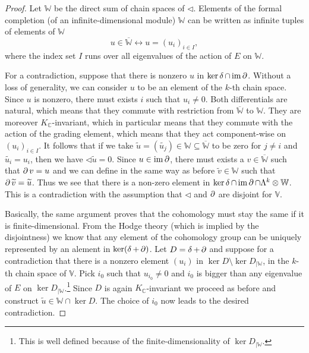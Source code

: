 \begin{proof}

Let $\mathbb{W}$ be the direct sum of chain spaces of $\lhd$. Elements of the formal completion (of an infinite-dimensional module) $\mathbb{W}$ can be written as infinite tuples of elements of $\mathbb{W}$
$$
u\in\overline{\mathbb{W}} \leftrightarrow u = (u_i)_{i\in I},
$$
where the index set $I$ runs over all eigenvalues of the action of $E$ on $\mathbb{W}$. 

For a contradiction, suppose that there is nonzero $u$ in $\ker \operatorname{\delta} \cap \operatorname{\mathrm{im}} \operatorname{\partial}$. Without a loss of generality, we can consider $u$ to be an element of the $k$-th chain space. Since $u$ is nonzero, there must exists $i$ such that $u_i\neq 0$. Both differentials are natural, which means that they commute with restriction from $\overline{\mathbb{W}}$ to $\mathbb{W}$. They are moreover $K_\mathbb{C}$-invariant, which in particular means that they commute with the action of the grading element, which means that they act component-wise on $(u_i)_{i \in I}$. It follows that if we take $\widetilde{u}= (\widetilde{u_j})\in \mathbb{W} \subseteq \overline{\mathbb{W}}$ to be zero  for $j\neq i$ and $\widetilde{u_i} = u_i$, then we have $\lhd \widetilde{u} = 0$.  Since $u\in \operatorname{\mathrm{im}} \operatorname{\partial}$, there must exists a $v\in\overline{\mathbb{W}}$ such that $\operatorname{\partial} v = u$ and we can define in the same way as before $\widetilde{v}\in\mathbb{W}$
such that $\operatorname{\partial} \widetilde{v} = \widetilde{u}$. Thus we see that there is a non-zero element in $\ker \operatorname{\delta} \cap \operatorname{\mathrm{im}} \operatorname{\partial}\cap \Lambda^k\otimes \mathbb{W}$. This is a contradiction with the assumption that $\lhd$ and $\operatorname{\partial}$ are disjoint for $\mathbb{V}$.


Basically, the same argument proves that the cohomology must stay the same if it is finite-dimensional. From the Hodge theory (which is implied by the disjointness) we know that any element of the cohomology group can be uniquely represented by an alement in $\ker (\operatorname{\delta} + \operatorname{\partial})$. Let $D=\operatorname{\delta} + \operatorname{\partial}$ and suppose for a contradiction that there is a nonzero element $(u_i)$ in $\ker D \setminus \ker D_{|\mathbb{W}}$, in the $k$-th chain space of $\mathbb{V}$. Pick $i_0$ such that $u_{i_0} \neq 0$ and $i_0$ is bigger than any eigenvalue of $E$ on $\ker D_{|\mathbb{W}}$.\footnote{This is well defined because of the finite-dimensionality of $\ker D_{|\mathbb{W}}$.} Since $D$ is again $K_\mathbb{C}$-invariant we proceed as before and construct $\widetilde{u}\in\mathbb{W}\cap\ker D$. The choice of $i_0$ now leads to the desired contradiction.

\end{proof}


